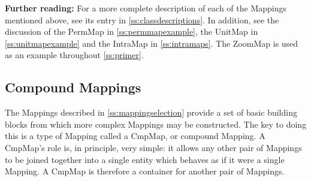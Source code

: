 \documentclass[twoside,11pt]{article}
\newcommand{\htmlref}[2]{#1}
\newcommand{\appref}[1]{Appendix~\ref{#1}}
\newcommand{\secref}[1]{\S\ref{#1}}
\renewcommand{\appref}[1]{\ref{#1}}
\renewcommand{\secref}[1]{\ref{#1}}
\begin{document}
{\bf{Further reading:}} For a more complete description of each of the
Mappings mentioned above, see its entry in
\appref{ss:classdescriptions}. In addition, see the discussion of the
PermMap in \secref{ss:permmapexample}, the \htmlref{UnitMap}{UnitMap} in
\secref{ss:unitmapexample} and the IntraMap in
\secref{ss:intramaps}. The ZoomMap is used as an example throughout
\secref{ss:primer}.

\subsection{\label{ss:cmpmapoverview}Compound Mappings}

The Mappings described in \secref{ss:mappingselection} provide a set
of basic building blocks from which more complex Mappings may be
constructed. The key to doing this is a type of \htmlref{Mapping}{Mapping} called a
\htmlref{CmpMap}{CmpMap}, or compound Mapping.  A CmpMap's role is, in principle, very
simple: it allows any other pair of Mappings to be joined together
into a single entity which behaves as if it were a single Mapping. A
CmpMap is therefore a container for another pair of Mappings.
\end{document}
